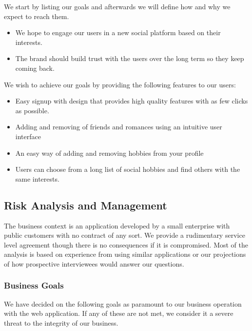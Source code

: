 \documentclass[a4paper]{article}
\begin{document}
We start by listing our goals and afterwards we will define how and why we expect to reach them.

\begin{itemize}
\item
We hope to engage our users in a new social platform based on their interests.
\item
The brand should build trust with the users over the long term so they keep coming back.
\end{itemize}

We wish to achieve our goals by providing the following features to our users:
\begin{itemize}
\item Easy signup with design that provides high quality features with as few clicks as possible.
\item Adding and removing of friends and romances using an intuitive user interface
\item An easy way of adding and removing hobbies from your profile
\item Users can choose from a long list of social hobbies and find others with the same interests.
\end{itemize}

\subsection{Risk Analysis and Management}
The business context is an application developed by a small enterprise with public customers with no contract of any sort. We provide a rudimentary service level agreement though there is no consequences if it is compromised. Most of the analysis is based on experience from using similar applications or our projections of how prospective interviewees would answer our questions.
\subsubsection{Business Goals}
We have decided on the following goals as paramount to our business operation with the web application. If any of these are not met, we consider it a severe threat to the integrity of our business.
\end{document}
